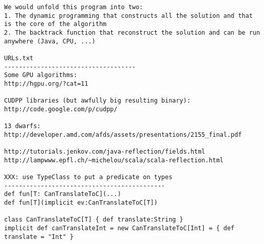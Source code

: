 \documentclass[11pt]{article}
\begin{document}
\begin{verbatim}
We would unfold this program into two:
1. The dynamic programming that constructs all the solution and that is the core of the algorithm
2. The backtrack function that reconstruct the solution and can be run anywhere (Java, CPU, ...)

URLs.txt
------------------------------------
Some GPU algorithms:
http://hgpu.org/?cat=11

CUDPP libraries (but awfully big resulting binary):
http://code.google.com/p/cudpp/

13 dwarfs:
http://developer.amd.com/afds/assets/presentations/2155_final.pdf

http://tutorials.jenkov.com/java-reflection/fields.html
http://lampwww.epfl.ch/~michelou/scala/scala-reflection.html

XXX: use TypeClass to put a predicate on types
--------------------------------------------
def fun[T: CanTranslateToC](...)
def fun[T](implicit ev:CanTranslateToC[T])

class CanTranslateToC[T] { def translate:String }
implicit def canTranslateInt = new CanTranslateToC[Int] = { def translate = "Int" }
\end{verbatim}

\newpage


\end{document}
